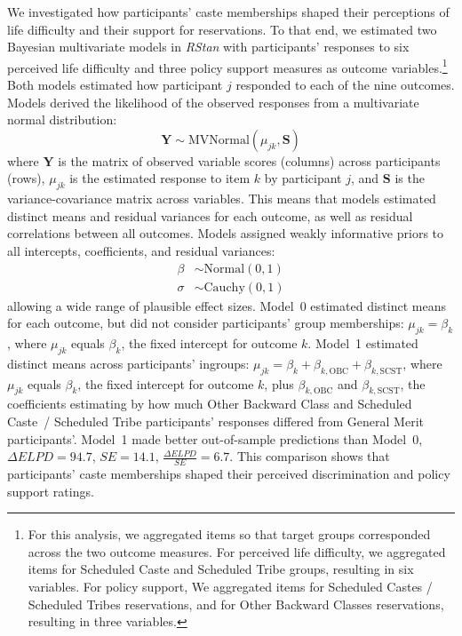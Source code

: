 \documentclass[12pt, a4paper]{article}
\begin{document}
We investigated how participants' caste memberships shaped their perceptions of life difficulty and their support for reservations. To that end, we estimated two Bayesian multivariate models in \emph{RStan} \cite{rstan_package} with participants' responses to six perceived life difficulty and three policy support measures as outcome variables.\footnote{For this analysis, we aggregated items so that target groups corresponded across the two outcome measures. For perceived life difficulty, we aggregated items for Scheduled Caste and Scheduled Tribe groups, resulting in six variables. For policy support, We aggregated items for Scheduled Castes / Scheduled Tribes reservations, and for Other Backward Classes reservations, resulting in three variables.} Both models estimated how participant $j$ responded to each of the nine outcomes. Models derived the likelihood of the observed responses from a multivariate normal distribution: $$ \textbf{Y} \sim \text{MVNormal} (\mu_{jk}, \textbf{S} ) $$ where $\textbf{Y}$ is the matrix of observed variable scores (columns) across participants (rows), $\mu_{jk}$ is the estimated response to item $k$ by participant $j$, and $\textbf{S}$ is the variance-covariance matrix across variables. This means that models estimated distinct means and residual variances for each outcome, as well as residual correlations between all outcomes. Models assigned weakly informative priors to all intercepts, coefficients, and residual variances: 
\begin{align*} 
\beta & \sim \text{Normal} (0, 1) \\ 
\sigma & \sim \text{Cauchy} (0, 1)
\end{align*}
allowing a wide range of plausible effect sizes. Model~0 estimated distinct means for each outcome, but did not consider participants' group memberships: $ \mu_{jk} =  \beta_k $, where $\mu_{jk}$ equals $\beta_{k}$, the fixed intercept for outcome $k$. Model~1 estimated distinct means across participants' ingroups: $ \mu_{jk} =  \beta_k + \beta_{k,\text{OBC}} + \beta_{k,\text{SCST}} $, where $\mu_{jk}$ equals $\beta_k$, the fixed intercept for outcome $k$, plus $\beta_{k,\text{OBC}}$ and $\beta_{k,\text{SCST}}$, the coefficients estimating by how much Other Backward Class and Scheduled Caste~/ Scheduled Tribe participants' responses differed from General Merit participants'. Model~1 made better out-of-sample predictions than Model~0, $\Delta\textit{ELPD} = 94.7$, $SE = 14.1$, $\frac{\Delta\textit{ELPD}}{\textit{SE}} = 6.7$. This comparison shows that participants' caste memberships shaped their perceived discrimination and policy support ratings. 
\end{document}
